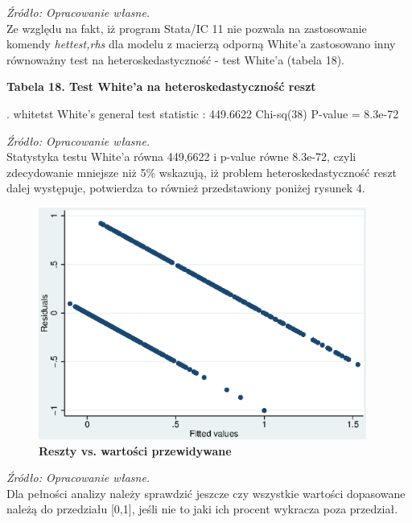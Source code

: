 \textit{\footnotesize{Źródło: Opracowanie własne.}} \\	

Ze względu na fakt, iż program Stata/IC 11 nie pozwala na zastosowanie komendy \textit{hettest,rhs} dla modelu z macierzą odporną White'a zastosowano inny równoważny test na heteroskedastyczność - test White'a (tabela 18).

 \vspace{0.5cm}

\textbf{Tabela 18. Test White'a na heteroskedastyczność reszt}
\begin{stlog}	

. whitetst
{\smallskip}
White's general test statistic :  449.6622  Chi-sq(38)  P-value =  8.3e-72

\end{stlog}

\textit{\footnotesize{Źródło: Opracowanie własne.}} \\	

Statystyka testu White'a równa 449,6622 i p-value równe 8.3e-72, czyli zdecydowanie mniejsze niż 5\% wskazują, iż problem heteroskedastyczność reszt dalej występuje, potwierdza to również przedstawiony poniżej rysunek 4. 


\begin{figure}[h]
\begin{centering}
  \includegraphics[height=3in]{Rysunki//resztyVSprzewidziane}
    \caption{\textbf{ Reszty vs. wartości przewidywane}}
\end{centering}
\end{figure}

\textit{\footnotesize{Źródło: Opracowanie własne.}} \\

Dla pełności analizy należy sprawdzić jeszcze czy wszystkie wartości dopasowane należą do przedziału [0,1], jeśli nie to jaki ich procent wykracza poza przedział. 

